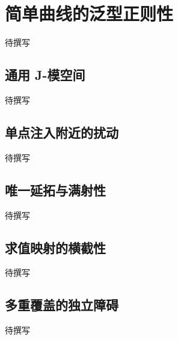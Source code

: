 
% 
% 

\section{简单曲线的泛型正则性}
\label{g4:sec:2304}

待撰写

\subsection{通用 J-模空间}
\label{g4:subsec:2304:01}
待撰写

\subsection{单点注入附近的扰动}
\label{g4:subsec:2304:02}
待撰写

\subsection{唯一延拓与满射性}
\label{g4:subsec:2304:03}
待撰写

\subsection{求值映射的横截性}
\label{g4:subsec:2304:04}
待撰写

\subsection{多重覆盖的独立障碍}
\label{g4:subsec:2304:05}
待撰写
